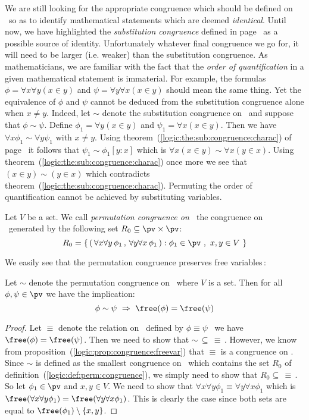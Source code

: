 We are still looking for the appropriate congruence which should be
defined on \pv\ so as to identify mathematical statements which are
deemed {\em identical}. Until now, we have highlighted the {\em
substitution congruence} defined in
page~\pageref{logic:def:sub:congruence} as a possible source of
identity. Unfortunately whatever final congruence we go for, it will
need to be larger (i.e. weaker) than the substitution congruence. As
mathematicians, we are familiar with the fact that the {\em order of
quantification} in a given mathematical statement is immaterial. For
example, the formulas $\phi=\forall x\forall y(x\in y)$ and
$\psi=\forall y\forall x(x\in y)$ should mean the same thing. Yet
the equivalence of $\phi$ and $\psi$ cannot be deduced from the
substitution congruence alone when $x\neq y$. Indeed, let $\sim$
denote the substitution congruence on \pv\ and suppose that
$\phi\sim\psi$. Define $\phi_{1}=\forall y(x\in y)$ and
$\psi_{1}=\forall x(x\in y)$. Then we have $\forall
x\phi_{1}\sim\forall y\psi_{1}$ with $x\neq y$. Using
theorem~(\ref{logic:the:sub:congruence:charac}) of
page~\pageref{logic:the:sub:congruence:charac} it follows that
$\psi_{1}\sim \phi_{1}[y\!:\!x]$ which is $\forall x(x\in
y)\sim\forall x(y\in x)$. Using
theorem~(\ref{logic:the:sub:congruence:charac}) once more we see
that $(x\in y)\sim(y\in x)$ which contradicts
theorem~(\ref{logic:the:sub:congruence:charac}). Permuting the order
of quantification cannot be achieved by substituting variables.
\begin{defin}\label{logic:def:perm:congruence}
Let $V$ be a set. We call {\em permutation congruence on \pv\ }the
congruence on \pv\ generated by the following set $R_{0}\subseteq
\pv\times\pv$:
    \[
    R_{0}=\left\{\,(\,\forall x\forall y\,\phi_{1}\,,\,\forall y\forall
    x\,\phi_{1}\,):\phi_{1}\in\pv\ ,\ x,y\in V\ \right\}
    \]
\end{defin}

We easily see that the permutation congruence preserves free variables\,:

\begin{prop}\label{logic:prop:FOPL:permcong:freevar}
Let $\sim$ denote the permutation congruence on \pv\ where $V$ is a
set. Then for all $\phi,\psi\in\pv$ we have the implication:
    \[
    \phi\sim\psi\ \Rightarrow\ \free(\phi)=\free(\psi)
    \]
\end{prop}
\begin{proof}
Let $\equiv$ denote the relation on \pv\ defined by $\phi\equiv\psi$
\ifand\ we have $\free(\phi)=\free(\psi)$. Then we need to show that
$\sim\,\subseteq\,\equiv\,$. However, we know from
proposition~(\ref{logic:prop:congruence:freevar}) that $\equiv$ is a
congruence on \pv. Since $\sim$ is defined as the smallest
congruence on \pv\ which contains the set $R_{0}$ of
definition~(\ref{logic:def:perm:congruence}), we simply need to show
that $R_{0}\subseteq\,\equiv\,$. So let $\phi_{1}\in\pv$ and $x,
y\in V$. We need to show that $\forall x\forall
y\phi_{1}\equiv\forall y\forall x\phi_{1}$ which is $\free(\forall
x\forall y\phi_{1})=\free(\forall y\forall x\phi_{1})$. This is
clearly the case since both sets are equal to
$\free(\phi_{1})\setminus\{x,y\}$.
\end{proof}


